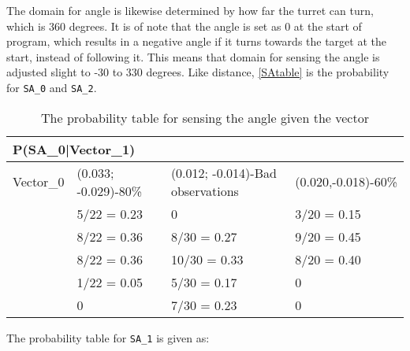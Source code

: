 
The domain for angle is likewise determined by how far the turret can turn,
which is 360 degrees. It is of note that the angle is set as 0 at the start of
program, which results in a negative angle if it turns towards the target at the
start, instead of following it. This means that domain for sensing the angle is
adjusted slight to -30 to 330 degrees. Like distance, \autoref{SAtable} is
the probability for \texttt{SA\_0} and \texttt{SA\_2}.
\begin{center}
\begin{table}[H]
\label{SAtable}
\begin{tabular}{|l|l|l|l|}
\hline
\multicolumn{4}{|l|}{P(SA\_0|Vector\_1)} \\ \hline
Vector\_0     & (0.033; -0.029)-80\% & (0.012; -0.014)-Bad observations &
(0.020,-0.018)-60\% \\\hline 
[-30 - 0]   & 5/22 = 0.23 & 0    & 3/20 = 0.15   \\ \hline 
[0 - 30]    & 8/22 = 0.36 & 8/30 = 0.27 & 9/20 = 0.45 \\ \hline
[30 - 60]   & 8/22 = 0.36 & 10/30 = 0.33 & 8/20 = 0.40 \\ \hline
[60 - 90]   & 1/22 = 0.05 & 5/30 = 0.17 & 0    \\ \hline
[90- 330]   & 0    & 7/30 = 0.23   & 0    \\ \hline
\end{tabular}
\caption{The probability table for sensing the angle given the vector}
\end{table}
\end{center}

The probability table for \texttt{SA\_1} is given as:

